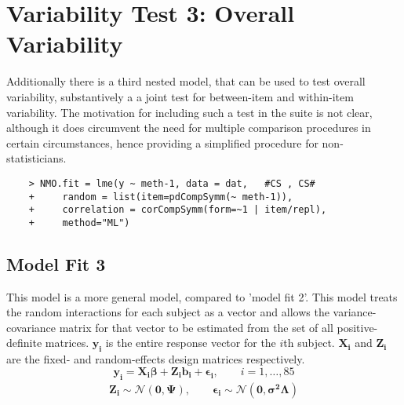 \documentclass[12pt, a4paper]{report}
\theoremstyle{plain}
\theoremstyle{definition}
\theoremstyle{remark}
\begin{document}
\section{Variability Test 3: Overall Variability}
Additionally there is a third nested model, that can be used to test overall variability, substantively a a joint test for between-item and within-item variability. The motivation for including such a test in the suite is not clear, although it does circumvent the need for multiple comparison procedures in certain circumstances, hence providing a simplified procedure for non-statisticians.

\begin{framed}
	\begin{verbatim}
	> NMO.fit = lme(y ~ meth-1, data = dat,   #CS , CS# 
	+     random = list(item=pdCompSymm(~ meth-1)), 
	+     correlation = corCompSymm(form=~1 | item/repl), 
	+     method="ML")
	\end{verbatim}
\end{framed}

\subsection{Model Fit 3}

This model is a more general model, compared to 'model fit 2'. This model treats the random interactions for each subject as a vector and
allows the variance-covariance matrix for that vector to be estimated from the set of all positive-definite matrices.
$\boldsymbol{y_{i}}$ is the entire response vector for the $i$th subject.
$\boldsymbol{X_{i}}$ and $\boldsymbol{Z_{i}}$  are the fixed- and random-effects design matrices respectively.
\begin{equation*}
\boldsymbol{y_{i}} = \boldsymbol{X_{i}\beta}  + \boldsymbol{Z_{i}b_{i}} + \boldsymbol{\epsilon_{i}}, \qquad i=1,\dots,85
\end{equation*}
\begin{eqnarray*}
	\boldsymbol{Z_{i}} \sim \mathcal{N}(\boldsymbol{0,\Psi}),\qquad
	\boldsymbol{\epsilon_{i}} \sim \mathcal{N}(\boldsymbol{0,\sigma^2\Lambda})
\end{eqnarray*}
\end{document}
